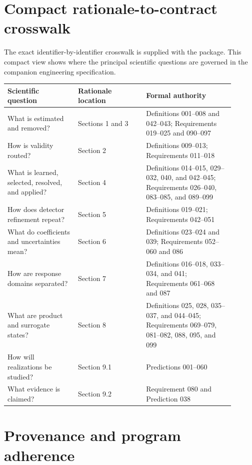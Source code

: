 \documentclass[11pt]{article}
\begin{document}
\appendix
\section{Compact rationale-to-contract crosswalk}
\label{sec:science-crosswalk}

The exact identifier-by-identifier crosswalk is supplied with the package.
This compact view shows where the principal scientific questions are governed
in the companion engineering specification.

\begingroup
\small
\begin{longtable}{>{\raggedright\arraybackslash}p{0.28\linewidth}
                  >{\raggedright\arraybackslash}p{0.27\linewidth}
                  >{\raggedright\arraybackslash}p{0.35\linewidth}}
\toprule
Scientific question & Rationale location & Formal authority \\
\midrule
\endhead
What is estimated and removed? & Sections 1 and 3 & Definitions 001--008 and 042--043; Requirements 019--025 and 090--097 \\
How is validity routed? & Section 2 & Definitions 009--013; Requirements 011--018 \\
What is learned, selected, resolved, and applied? & Section 4 & Definitions 014--015, 029--032, 040, and 042--045; Requirements 026--040, 083--085, and 089--099 \\
How does detector refinement repeat? & Section 5 & Definitions 019--021; Requirements 042--051 \\
What do coefficients and uncertainties mean? & Section 6 & Definitions 023--024 and 039; Requirements 052--060 and 086 \\
How are response domains separated? & Section 7 & Definitions 016--018, 033--034, and 041; Requirements 061--068 and 087 \\
What are product and surrogate states? & Section 8 & Definitions 025, 028, 035--037, and 044--045; Requirements 069--079, 081--082, 088, 095, and 099 \\
How will realizations be studied? & Section 9.1 & Predictions 001--060 \\
What evidence is claimed? & Section 9.2 & Requirement 080 and Prediction 038 \\
\bottomrule
\end{longtable}
\endgroup

\section{Provenance and program adherence}
\label{sec:science-program}
\end{document}
